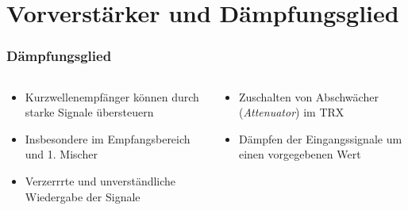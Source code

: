 
\section{Vorverstärker und Dämpfungsglied}
\label{section:vorverstaerker_daempfungsglied}
\begin{frame}%

\frametitle{Dämpfungsglied}
\begin{columns}
    \begin{column}{0.48\textwidth}
    \begin{itemize}
  \item Kurzwellenempfänger können durch starke Signale übersteuern
  \item Insbesondere im Empfangsbereich und 1. Mischer
  \item Verzerrrte und unverständliche Wiedergabe der Signale
  \end{itemize}

    \end{column}
   \begin{column}{0.48\textwidth}
       \begin{itemize}
  \item Zuschalten von Abschwächer (\emph{Attenuator}) im TRX
  \item Dämpfen der Eingangssignale um einen vorgegebenen Wert
  \end{itemize}

   \end{column}
\end{columns}

\end{frame}

\begin{frame}
\end{frame}

